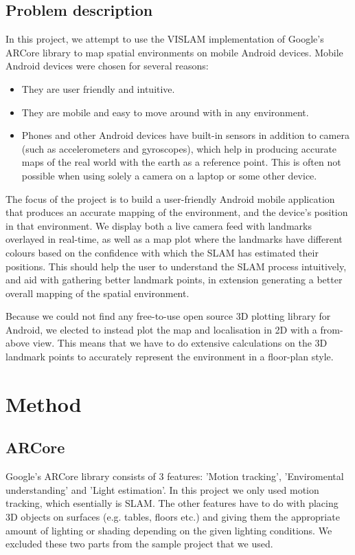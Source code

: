 \documentclass{article}
\begin{document}
\subsection{Problem description}
In this project, we attempt to use the VISLAM implementation of Google's ARCore library \cite{ARCore} to map spatial environments on mobile Android devices. Mobile Android devices were chosen for several reasons:
\begin{itemize}
    \item They are user friendly and intuitive.
    \item They are mobile and easy to move around with in any environment.
    \item Phones and other Android devices have built-in sensors in addition to camera (such as accelerometers and gyroscopes), which help in producing accurate maps of the real world with the earth as a reference point. This is often not possible when using solely a camera on a laptop or some other device.
\end{itemize}

The focus of the project is to build a user-friendly Android mobile application that produces an accurate mapping of the environment, and the device's position in that environment. We display both a live camera feed with landmarks overlayed in real-time, as well as a map plot where the landmarks have different colours based on the confidence with which the SLAM has estimated their positions. This should help the user to understand the SLAM process intuitively, and aid with gathering better landmark points, in extension generating a better overall mapping of the spatial environment.

Because we could not find any free-to-use open source 3D plotting library for Android, we elected to instead plot the map and localisation in 2D with a from-above view. This means that we have to do extensive calculations on the 3D landmark points to accurately represent the environment in a floor-plan style.

\section{Method}
\subsection{ARCore}

Google's ARCore library consists of 3 features: 'Motion tracking', 'Enviromental understanding' and 'Light estimation'. In this project we only used motion tracking, which esentially is SLAM. The other features have to do with placing 3D objects on surfaces (e.g. tables, floors etc.) and giving them the appropriate amount of lighting or shading depending on the given lighting conditions. We excluded these two parts from the sample project that we used. \cite{ARCore}
\end{document}
